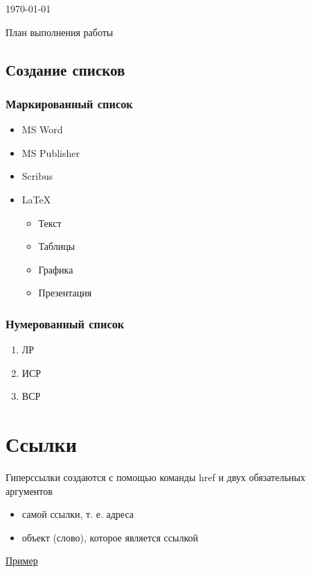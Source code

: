 \documentclass[a4paper,12pt]{article} %
\begin{document}
\begin{flushright}
\today
\end{flushright}

\begin{flushleft}
План выполнения работы
\end{flushleft}

\subsection{Создание списков}
\subsubsection{Маркированный список}
\begin{itemize}
\item MS Word
\item MS Publisher
\item Scribus
\item \LaTeX
\begin{itemize}
\item Текст
\item Таблицы
\item Графика
\item Презентация
\end{itemize}
\end{itemize}
\subsubsection{Нумерованный список}
\begin{enumerate}
\item ЛР
\item ИСР
\item ВСР
\end{enumerate}
\section{Ссылки}
Гиперссылки создаются с помощью команды href и двух обязательных аргументов
\begin{itemize}
\item самой ссылки, т. е. адреса
\item объект (слово), которое является ссылкой
\end{itemize}
\href{https://moodle.herzen.spb.ru/mod/assign/view.php?id=39031}{Пример}
\end{document}
